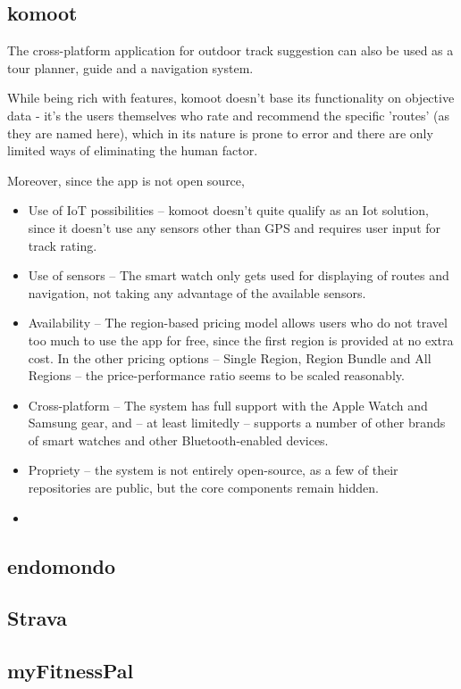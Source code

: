 \subsection{komoot}
The cross-platform application for outdoor track suggestion can also be used as a tour planner, guide and a navigation system.

While being rich with features, komoot doesn't base its functionality on objective data - it's the users themselves who rate and recommend the specific 'routes' (as they are named here),
which in its nature  is prone to error and there are only limited ways of eliminating the human factor.

Moreover, since the app is not open source, 

\begin{itemize}
    \item Use of IoT possibilities -- komoot doesn't quite qualify as an Iot solution, since it doesn't use any sensors other than GPS and requires user input for track rating.
    \item Use of sensors -- The smart watch only gets used for displaying of routes and navigation, not taking any advantage of the available sensors.
    \item Availability -- The region-based pricing model allows users who do not travel too much to use the app for free,
    since the first region is provided at no extra cost.
    In the other pricing options -- Single Region, Region Bundle and All Regions -- the price-performance ratio seems to be scaled reasonably. 
    \item Cross-platform -- The system has full support with the Apple Watch and Samsung gear, and -- at least limitedly -- supports a number of other brands of smart watches and other Bluetooth-enabled devices.
    \item Propriety -- the system is not entirely open-source, as a few of their repositories are public, but the core components remain hidden. 
    \item 
\end{itemize}

\subsection{endomondo}

\subsection{Strava}

\subsection{myFitnessPal}